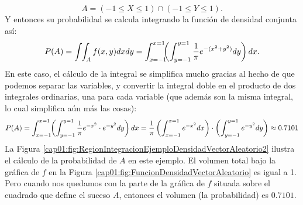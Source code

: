 \begin{ejemplo}
\[
A = (-1\leq X\leq 1)\cap(-1\leq Y\leq 1).
\]
Y entonces su probabilidad se calcula integrando la función de densidad conjunta así:
\[
P(A)=\displaystyle\int\hspace{-1mm}\int_A f(x,y)dxdy =
\displaystyle\int_{x=-1}^{x=1}\hspace{-2mm}\left(\int_{y=-1}^{y=1} \dfrac{1}{\pi}e^{-(x^2+y^2)}dy\right)dx.
\]
En este caso, el cálculo de la integral se simplifica mucho gracias al hecho de que podemos separar las variables, y convertir la integral doble en el producto de dos integrales ordinarias, una para cada variable (que además son la misma integral, lo cual simplifica aún más las cosas):
{\small
\[
P(A)=\displaystyle\int_{x=-1}^{x=1}\hspace{-1mm}\left(\int_{y=-1}^{y=1}
\dfrac{1}{\pi}e^{-x^2}\cdot e^{-y^2}dy\right)dx=
\dfrac{1}{\pi}
\left(\displaystyle\int_{x=-1}^{x=1}e^{-x^2}dx\right)
\cdot
\left(\displaystyle\int_{y=-1}^{y=1}e^{-y^2}dy\right)\approx 0.7101
\]
}
La Figura \ref{cap01:fig:RegionIntegracionEjemploDensidadVectorAleatorio2} ilustra el cálculo de la probabilidad de $A$ en este ejemplo. El volumen total bajo la gráfica de $f$ en la Figura \ref{cap01:fig:FuncionDensidadVectorAleatorio} es igual a 1. Pero cuando nos quedamos con la parte de la gráfica de $f$ situada sobre el cuadrado que define el suceso $A$, entonces el volumen (la probabilidad) es $0.7101$.


\end{ejemplo}
